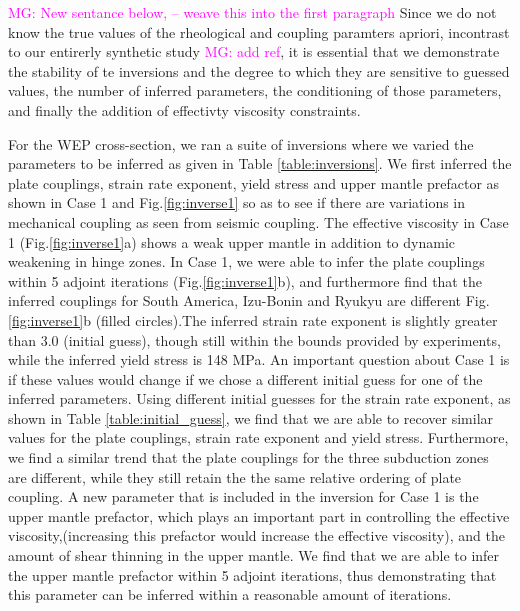\documentclass[12pt]{article}
\newcommand{\mgnote}[1]{\textcolor{magenta}{MG: #1}}
\begin{document}

\mgnote{New sentance below, -- weave this into the first paragraph}
Since we do not know the true values of the rheological and coupling 
paramters apriori, incontrast to our entirerly synthetic study \mgnote{add ref}, it is essential that we demonstrate the stability of te inversions and
the degree to which they are sensitive to guessed values, the number of
inferred parameters, the conditioning of those parameters, and
finally the addition of effectivty viscosity constraints.

For the WEP cross-section, we ran a suite of inversions where we varied the parameters to be inferred as given in Table \ref{table:inversions}.  We first inferred the plate couplings, strain rate exponent, yield stress and upper mantle prefactor as shown in Case 1 and Fig.\ref{fig:inverse1} so as to see if there are variations in mechanical coupling as seen from seismic coupling. The effective viscosity in Case 1 (Fig.\ref{fig:inverse1}a) shows a weak upper mantle in addition to dynamic weakening in hinge zones.  In Case 1, we were able to infer the plate couplings within 5 adjoint iterations (Fig.\ref{fig:inverse1}b), and furthermore find that the inferred couplings for South America, Izu-Bonin and Ryukyu are different Fig.\ref{fig:inverse1}b (filled circles).The inferred strain rate exponent is slightly greater than 3.0 (initial guess), though still within the bounds provided by experiments, while the inferred yield stress is 148 MPa. An important question about Case 1 is if these values would change if we chose a different initial guess for one of the inferred parameters. Using different initial guesses for the strain rate exponent, as shown in Table \ref{table:initial_guess}, we find that we are able to recover similar values for the plate couplings, strain rate exponent and yield stress. Furthermore, we find a similar trend that the plate couplings for the three subduction zones are different, while they still retain the the same relative ordering of plate coupling.   
A new parameter that is included in the inversion for Case 1 is the upper mantle prefactor, which plays an important part in controlling the effective viscosity,(increasing this prefactor would increase the effective viscosity), and the amount of shear thinning in the upper mantle. We find that we are able to infer the upper mantle prefactor within 5 adjoint iterations, thus demonstrating that this parameter can be inferred within a reasonable amount of iterations.
\end{document}
